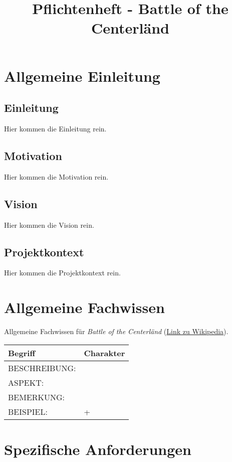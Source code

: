 \documentclass{uulm-assignment}
\title{Pflichtenheft - Battle of the Centerländ}
\newcommand{\game}{Battle of the Centerländ}
\begin{document}
    \maketitle

    \section{Allgemeine Einleitung}

    \subsection{Einleitung}
    Hier kommen die Einleitung rein.
    
    \subsection{Motivation}
    Hier kommen die Motivation rein.
    \subsection{Vision}
    Hier kommen die Vision rein.
    \subsection{Projektkontext}
    Hier kommen die Projektkontext rein.
    \section{Allgemeine Fachwissen}

   Allgemeine Fachwissen für \emph{\game} (\href{https://de.wikipedia.org/wiki/Robo_Rally}{Link zu Wikipedia}).
   
   \begin{tabularx}{\textwidth}{|l|X |} \hline
        \textbf{Begriff} & \textbf{Charakter} \\
        \hline
        BESCHREIBUNG: &  \\
        \hline
        ASPEKT: &
        \\
        \hline
        BEMERKUNG: & \\
        \hline
        BEISPIEL: & +\\
        \hline
    \end{tabularx}
    
    \section{Spezifische Anforderungen}
\end{document}
